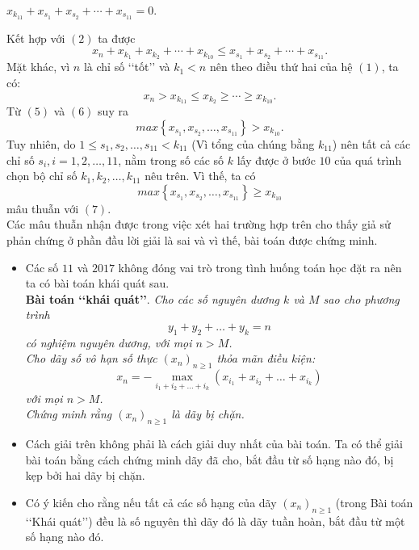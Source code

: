 \begin{bt}
{\begin{itemize}
			\begin{center}
				$x_{k_{11}}+x_{s_{1}}+x_{s_{2}}+\cdots+x_{s_{11}}=0$.
			\end{center}
			Kết hợp với $(2)$ ta được
			\[x_n+x_{k_{1}}+x_{k_{2}}+\cdots+x_{k_{10}}\le x_{s_{1}}+x_{s_{2}}+\cdots+x_{s_{11}}.\tag{5}\]
			Mặt khác, vì $n$ là chỉ số \lq\lq tốt\rq\rq \hspace{0.05cm} và $k_1<n$ nên theo điều thứ hai của hệ $(1)$, ta có:
			\[ x_n>x_{k_{11}}\le x_{k_{2}}\ge \cdots \ge x_{k_{10}}.\tag{6}\]
			Từ $(5)$ và $(6)$ suy ra 
			\[max \left\{x_{s_1},x_{s_2},\ldots, x_{s_{11}} \right\}>x_{k_{10}}.\tag{7}\]
			Tuy nhiên, do $1\le s_1,s_2,\ldots,s_{11}<k_{11}$ (Vì tổng của chúng bằng $k_{11}$) nên tất cả các chỉ số $s_i, i = 1,2,\ldots,11$, nằm trong số các số $k$ lấy được ở bước $10$ của quá trình chọn bộ chỉ số $k_1,k_2,\ldots,k_{11}$ nêu trên. Vì thế, ta có
			\[ max \left\{ x_{s_1},x_{s_2},\ldots,x_{s_{11}} \right\} \ge x_{k_{10}}\]
			mâu thuẫn với $(7)$.\\
			Các mâu thuẫn nhận được trong việc xét hai trường hợp trên cho thấy giả sử phản chứng ở phần đầu lời giải là sai và vì thế, bài toán được chứng minh.
		\end{itemize}
		\begin{nx}\hfill
			\begin{itemize}
				\item Các số $11$ và $2017$ không đóng vai trò trong tình huống toán học đặt ra nên ta có bài toán khái quát sau.\\
				\textbf{Bài toán \lq\lq khái quát\rq\rq}. \textit{Cho các số nguyên dương $k$ và $M$ sao cho phương trình 
					\[y_1+y_2+\ldots+y_k=n\]
					có nghiệm nguyên dương, với mọi $n>M$.\\
					Cho dãy số vô hạn số thực $\left(x_n\right)_{n\ge 1}$ thỏa mãn điều kiện:
					\[x_n=-\mathop {max}\limits_{i_1+i_2+\ldots +i_{k}}\left(x_{i_1}+x_{i_2}+\ldots +x_{i_{k}}\right)\]
					với mọi $n>M$.\\
					Chứng minh rằng $\left(x_n\right)_{n\ge 1}$ là dãy bị chặn.
				}
				\item Cách giải trên không phải là cách giải duy nhất của bài toán. Ta có thể giải bài toán bằng cách chứng minh dãy đã cho, bắt đầu từ số hạng nào đó, bị kẹp bởi hai dãy bị chặn.
				\item Có ý kiến cho rằng nếu tất cả các số hạng của dãy $\left(x_n\right)_{n\ge 1}$ (trong Bài toán \lq\lq Khái quát\rq\rq) \hspace{0.05cm} đều là số nguyên thì dãy đó là dãy tuần hoàn, bắt đầu từ một số hạng nào đó.
			\end{itemize}
		\end{nx}
	}
\end{bt}

